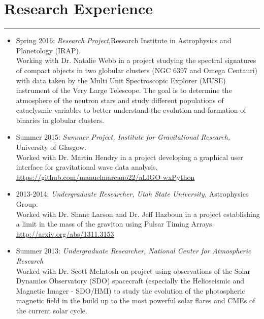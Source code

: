 \documentclass[letterpaper,10pt]{article}
\begin{document}

\section*{Research Experience}

\hrule
\vspace{.3 cm}



\begin{itemize}[label=$\blacktriangleright$]
        \item Spring 2016: \emph{Research Project},Research Institute in Astrophysics and Planetology (IRAP).\\
                Working with Dr. Natalie Webb in a project studying the spectral signatures of compact objects in two globular clusters (NGC 6397 and Omega Centauri) with data taken by the Multi Unit Spectroscopic Explorer (MUSE) instrument of the Very Large Telescope. The goal is to determine the atmosphere of the neutron stars and study different populations of cataclysmic variables to better understand the evolution and formation of binaries in globular clusters. 
\end{itemize}



\begin{itemize}[label=$\blacktriangleright$]
\item Summer 2015: \emph{Summer Project,  Institute for Gravitational Research,} University of Glasgow.\\
 Worked with Dr. Martin Hendry in a project developing a graphical user interface for gravitational wave data analysis. \url{https://github.com/manuelmarcano22/aLIGO-wxPython}
\end{itemize}



\begin{itemize}[label=$\blacktriangleright$]
  \item 2013-2014: \emph{Undergraduate Researcher, Utah State University,} Astrophysics Group.  \\
  Worked with Dr. Shane Larson and Dr. Jeff Hazboun in a project establishing a limit in the mass of the graviton using Pulsar Timing Arrays. \url{http://arxiv.org/abs/1311.3153}
  \end{itemize}

\begin{itemize}[label=$\blacktriangleright$]
  \item Summer 2013: \emph{Undergraduate Researcher, National Center for Atmospheric Research} \\
Worked with Dr. Scott McIntosh on project using observations of the Solar Dynamics Observatory (SDO) spacecraft (especially the Helioseismic and Magnetic Imager - SDO/HMI) to study the evolution of the photospheric magnetic field in the build up to the most powerful solar flares and CMEs of the current solar cycle.
  \end{itemize}
\end{document}
